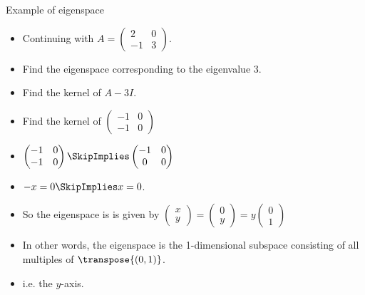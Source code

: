\documentclass{beamer}
\begin{document}
\begin{frame}{Example of eigenspace}

\begin{itemize}
\item Continuing with $A=
\begin{pmatrix}
2 & 0 \\
-1 & 3
\end{pmatrix}
$.
\item Find the eigenspace corresponding to the eigenvalue $3$.
\item Find the kernel of $A-3I$.
\item Find the kernel of
$
\begin{pmatrix}
-1 & 0 \\
-1 & 0
\end{pmatrix}
$
\item
$
\begin{pmatrix}
-1 & 0 \\
-1 & 0
\end{pmatrix}
\SkipImplies
\begin{pmatrix}
-1 & 0 \\
 0 & 0
\end{pmatrix}
$
\item $-x  = 0 \SkipImplies x = 0$.
\item So the eigenspace is is given by
$
\begin{pmatrix}
x \\ y
\end{pmatrix}
=
\begin{pmatrix}
0 \\ y
\end{pmatrix}
=
y
\begin{pmatrix}
0 \\ 1
\end{pmatrix}
$
\item In other words, the eigenspace is the 1-dimensional subspace consisting of
all multiples of $\transpose{(0,1)}$.
\item i.e. the $y$-axis.
\end{itemize}
\end{frame}
\end{document}
